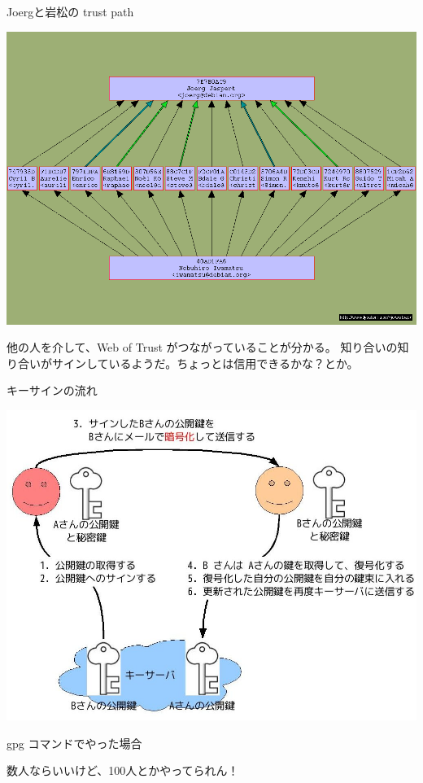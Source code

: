 \begin{frame}[containsverbatim]{Joergと岩松の trust path}
\begin{center}
\includegraphics[width=0.8\hsize]{image200909/0x40AD1FA6-0x7E7B8AC9.png}
\end{center}
他の人を介して、Web of Trust がつながっていることが分かる。
知り合いの知り合いがサインしているようだ。ちょっとは信用できるかな？とか。
\end{frame}

\begin{frame}{キーサインの流れ}
\begin{center}
\includegraphics[width=1\hsize]{image200909/gpg-key.jpg}
\end{center}
\end{frame}

\begin{frame}[containsverbatim]{gpg コマンドでやった場合}
\Huge 数人ならいいけど、100人とかやってられん！
\end{frame}


